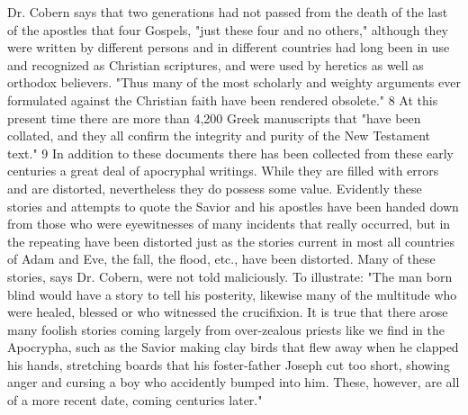Dr. Cobern says that two generations had not passed from the death of the last of the apostles
that four Gospels, "just these four and no others," although they were written by different
persons and in different countries had long been in use and recognized as Christian
scriptures, and were used by heretics as well as orthodox believers. "Thus many of the most
scholarly and weighty arguments ever formulated against the Christian faith have been
rendered obsolete." 8 At this present time there are more than 4,200 Greek manuscripts that
"have been collated, and they all confirm the integrity and purity of the New Testament text."
9 In addition to these documents there has been collected from these early centuries a great
deal of apocryphal writings. While they are filled with errors and are distorted, nevertheless
they do possess some value. Evidently these stories and attempts to quote the Savior and his
apostles have been handed down from those who were eyewitnesses of many incidents that
really occurred, but in the repeating have been distorted just as the stories current in most all
countries of Adam and Eve, the fall, the flood, etc., have been distorted. Many of these
stories, says Dr. Cobern, were not told maliciously. To illustrate: "The man born blind would
have a story to tell his posterity, likewise many of the multitude who were healed, blessed or
who witnessed the crucifixion. It is true that there arose many foolish stories coming largely
from over-zealous priests like we find in the Apocrypha, such as the Savior making clay
birds that flew away when he clapped his hands, stretching boards that his foster-father
Joseph cut too short, showing anger and cursing a boy who accidently bumped into him.
These, however, are all of a more recent date, coming centuries later."

